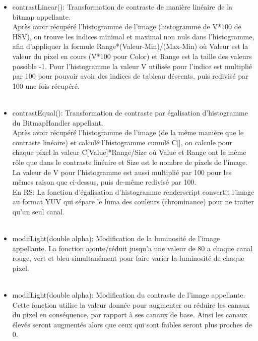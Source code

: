 \documentclass[12pt]{article}
\begin{document}
\begin{itemize}
\begin{itemize}
        \\
        \item contrastLinear():
        Transformation de contraste de manière linéaire de la bitmap appellante.\\
        Après avoir récupéré l'histogramme de l'image (histogramme de V*100 de HSV),
        on trouve les indices minimal et maximal non nuls dans l'histogramme, afin d'appliquer la formule Range*(Valeur-Min)/(Max-Min) où Valeur est 
        la valeur du pixel en cours (V*100 pour Color) et Range est la taille des valeurs possible -1. Pour l'histogramme la valeur V utilisée pour l'indice est multiplié par 100 pour pouvoir avoir des indices de tableau 
        déscents, puis redivisé par 100 une fois récupéré.\\
        \\
        \item contrastEqual():
        Transformation de contraste par égalisation d'histogramme du BitmapHandler appellant.\\
        Après avoir récupéré l'histogramme de l'image (de la même manière que le contraste linéaire) et calculé l'histogramme cumulé C[],
        on calcule pour chaque pixel la valeur C[Value]*Range/Size où Value et Range ont le même rôle que dans le contraste linéaire 
        et Size est le nombre de pixels de l'image. La valeur de V pour l'histogramme est aussi multiplié par 100 
        pour les mêmes raison que ci-dessus, puis de-même redivisé par 100.\\
        En RS: La fonction d'égalisation d'histogramme renderscript convertit l'image au format YUV qui sépare le luma des couleurs (chrominance) pour ne traiter qu'un seul canal.\\
        \\
        \item modifLight(double alpha):   
        Modification de la luminosité de l'image appellante.
        La fonction ajoute/réduit jusqu'a une valeur de 80 a chaque canal rouge, vert et bleu simultanément pour faire varier la luminosité de chaque pixel.\\
        \\
        \item modifLight(double alpha):   
        Modification du contraste de l'image appellante.
        Cette fonction utilise la valeur donnée pour augmenter ou réduire les canaux du pixel en conséquence, par rapport à ses canaux de base. Ainsi les canaux élevés seront augmentés alors que ceux qui sont faibles seront plus proches de 0.\\
        \\
    \end{itemize}


\end{itemize}
\end{document}
